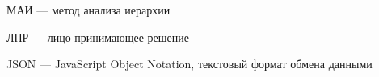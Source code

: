 



\hypertarget{mai}{МАИ --- метод анализа иерархии}






\hypertarget{lpr}{ЛПР --- лицо принимающее решение}










\hypertarget{json}{JSON --- JavaScript Object Notation, текстовый формат обмена данными}

\clearpage
